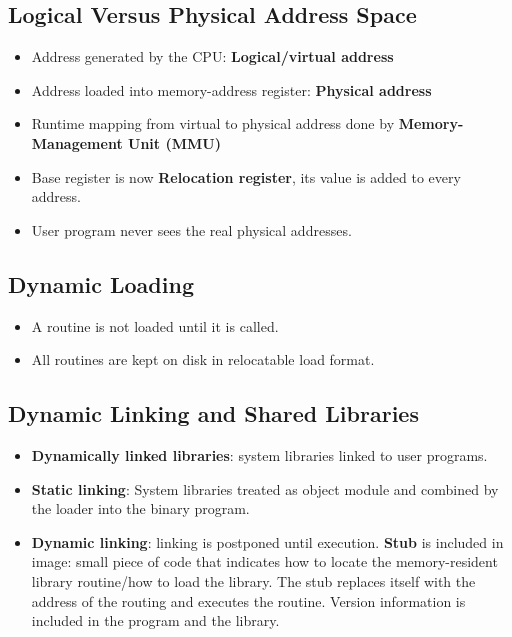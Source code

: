 \documentclass[10pt]{report}
\begin{document}
		\subsection{Logical Versus Physical Address Space}
			\begin{itemize}
				\item Address generated by the CPU: \textbf{Logical/virtual address}
				\item Address loaded into memory-address register: \textbf{Physical address}
				\item Runtime mapping from virtual to physical address done by \textbf{Memory-Management Unit (MMU)}
				\item Base register is now \textbf{Relocation register}, its value is added to every address.
				\item User program never sees the real physical addresses.
			\end{itemize}

		\subsection{Dynamic Loading}
			\begin{itemize}
				\item A routine is not loaded until it is called.
				\item All routines are kept on disk in relocatable load format.
			\end{itemize}

		\subsection{Dynamic Linking and Shared Libraries}
			\begin{itemize}
				\item \textbf{Dynamically linked libraries}: system libraries linked to user programs.
				\item \textbf{Static linking}: System libraries treated as object module and combined by the loader into the binary program.
				\item \textbf{Dynamic linking}: linking is postponed until execution. \textbf{Stub} is included in image: small piece of code that indicates how to locate the memory-resident library routine/how to load the library. The stub replaces itself with the address of the routing and executes the routine. Version information is included in the program and the library.
			\end{itemize}
\end{document}
